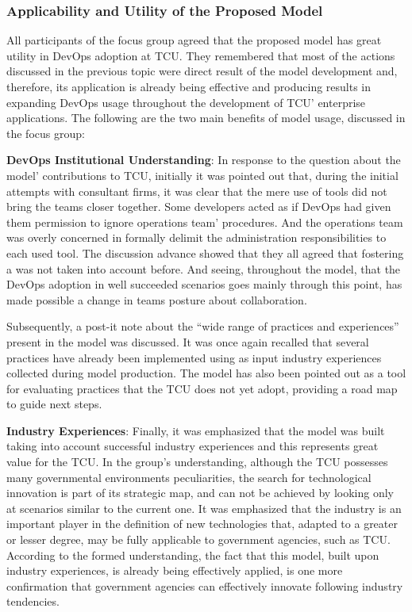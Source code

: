 \subsubsection{Applicability and Utility of the Proposed Model}

{
\color{blue}
All participants of the focus group agreed that the proposed model has great
utility in DevOps adoption at TCU. They remembered that most of the actions
discussed in the previous topic were direct result of the model development and,
therefore, its application is already being effective and producing results in
expanding DevOps usage throughout the development of TCU' enterprise applications.
The following are the two main benefits of model usage, discussed in the focus
group:

\textbf{DevOps Institutional Understanding}: In response to the question about
the model' contributions to TCU, initially it was pointed out that, during the
initial attempts with consultant firms, it was clear that the mere use of
tools did not bring the teams closer together. Some developers acted as if DevOps
had given them permission to ignore operations team' procedures. And the
operations team was overly concerned in formally delimit the administration
responsibilities to each used tool. The discussion advance showed that they all
agreed that fostering a \cc was not taken into account before. And seeing,
throughout the model, that the DevOps adoption in well succeeded scenarios goes
mainly through this point, has made possible a change in teams posture about
collaboration.

Subsequently, a post-it note about the ``wide range of practices and experiences''
present in the model was discussed. It was once again recalled that several
practices have already been implemented using as input industry experiences
collected during model production. The model has also been pointed out as a tool
for evaluating practices that the TCU does not yet adopt, providing a road map
to guide next steps.

\textbf{Industry Experiences}: Finally, it was emphasized that the model was
built taking into account successful industry experiences and this represents
great value for the TCU. In the group's understanding, although the TCU
possesses many governmental environments peculiarities, the search for
technological innovation is part of its strategic map, and can not be achieved
by looking only at scenarios similar to the current one. It was emphasized that
the industry is an important player in the definition of new technologies that,
adapted to a greater or lesser degree, may be fully applicable to government
agencies, such as TCU. According to the formed understanding, the fact that this
model, built upon industry experiences, is already being effectively applied, is
one more confirmation that government agencies can effectively innovate following
industry tendencies.
}

